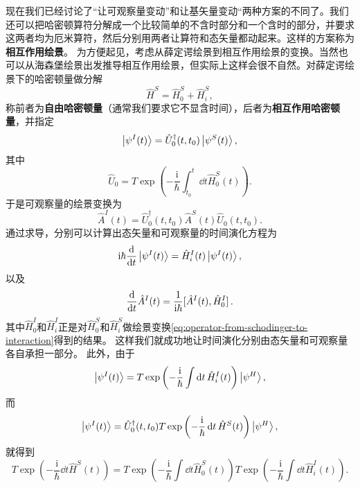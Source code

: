 \documentclass[hyperref, UTF8, a4paper]{ctexart}
\newcommand*{\ii}{\mathrm{i}}
\begin{document}
现在我们已经讨论了“让可观察量变动”和让基矢量变动“两种方案的不同了。我们还可以把哈密顿算符分解成一个比较简单的不含时部分和一个含时的部分，并要求这两者均为厄米算符，然后分别用两者让算符和态矢量都动起来。这样的方案称为\textbf{相互作用绘景}。
为方便起见，考虑从薛定谔绘景到相互作用绘景的变换。当然也可以从海森堡绘景出发推导相互作用绘景，但实际上这样会很不自然。对薛定谔绘景下的哈密顿量做分解
\begin{equation}
    \hat{H}^S = \hat{H}_0^S + \hat{H}_i^S,
\end{equation}
称前者为\textbf{自由哈密顿量}（通常我们要求它不显含时间），后者为\textbf{相互作用哈密顿量}，并指定
\begin{equation}
    \ket{\psi^I(t)} = \hat{U}_0^\dagger(t,t_0) \ket{\psi^S(t)},
\end{equation}
其中
\begin{equation}
    \hat{U}_0 = T \exp \left( - \frac{\ii}{\hbar} \int_{t_0}^t \dd{t} \hat{H}_0^S(t) \right).
\end{equation}
于是可观察量的绘景变换为
\begin{equation}
    \hat{A}^I(t) = \hat{U}_0^\dagger(t,t_0) \hat{A}^S(t) \hat{U}_0(t,t_0).
    \label{eq:operator-from-schodinger-to-interaction}
\end{equation}
通过求导，分别可以计算出态矢量和可观察量的时间演化方程为
\begin{equation}
    \ii \hbar \dv{t} \ket{\psi^I(t)} = \hat{H}^I_i(t) \ket{\psi^I(t)},
    \label{eq:time-evolution-in-interation-picture}
\end{equation}
以及
\begin{equation}
    \dv{t} \hat{A}^I(t) = \frac{1}{\ii \hbar} \comm*{\hat{A}^I(t)}{\hat{H}_0^I}.
\end{equation}
其中$\hat{H}_0^I$和$\hat{H}_i^I$正是对$\hat{H}_0^S$和$\hat{H}_i^S$做绘景变换\eqref{eq:operator-from-schodinger-to-interaction}得到的结果。
这样我们就成功地让时间演化分别由态矢量和可观察量各自承担一部分。
此外，由于
\[
    \ket{\psi^I(t)} = T \exp \left( - \frac{\ii}{\hbar} \int \dd{t} \hat{H}_i^I(t) \right) \ket{\psi^H},
\]
而
\[
    \ket{\psi^I(t)} = \hat{U}_0^\dagger (t, t_0) T \exp \left( - \frac{\ii}{\hbar} \dd{t} \hat{H}^S(t) \right) \ket{\psi^H},
\]
就得到
\begin{equation}
    T \exp \left( - \frac{\ii}{\hbar} \dd{t} \hat{H}^S(t) \right) = T \exp \left( - \frac{\ii}{\hbar} \int \dd{t} \hat{H}^S_0(t) \right) T \exp \left( - \frac{\ii}{\hbar} \int \dd{t} \hat{H}_i^I(t) \right).
\end{equation}
\end{document}

